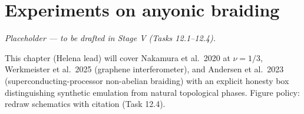\chapter{Experiments on anyonic braiding}\label{ch:experiments}

\emph{Placeholder --- to be drafted in Stage V (Tasks 12.1--12.4).}

This chapter (Helena lead) will cover Nakamura et al.\ 2020 at $\nu = 1/3$, Werkmeister et al.\ 2025 (graphene interferometer), and Andersen et al.\ 2023 (superconducting-processor non-abelian braiding) with an explicit honesty box distinguishing synthetic emulation from natural topological phases. Figure policy: redraw schematics with citation (Task 12.4).
